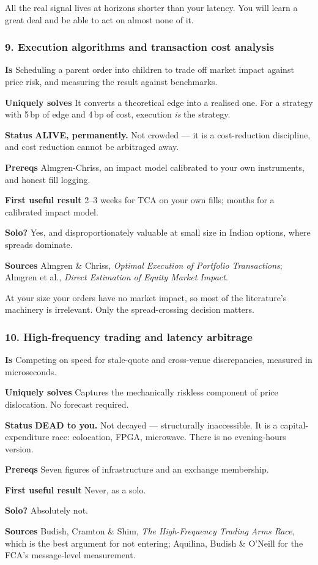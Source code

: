 \documentclass[11pt,a4paper]{article}
\newcommand{\alv}[1]{\textcolor{alive}{\textbf{#1}}}
\newcommand{\dec}[1]{\textcolor{decayed}{\textbf{#1}}}
\newcommand{\fitem}[1]{\par\smallskip\noindent\textbf{#1} }
\begin{document}
\begin{waste}
All the real signal lives at horizons shorter than your latency. You will learn
a great deal and be able to act on almost none of it.
\end{waste}

\subsubsection{9. Execution algorithms and transaction cost analysis}
\fitem{Is}Scheduling a parent order into children to trade off market impact
against price risk, and measuring the result against benchmarks.
\fitem{Uniquely solves}It converts a theoretical edge into a realised one. For a
strategy with 5\,bp of edge and 4\,bp of cost, execution \emph{is} the strategy.
\fitem{Status}\alv{ALIVE, permanently.} Not crowded --- it is a cost-reduction
discipline, and cost reduction cannot be arbitraged away.
\fitem{Prereqs}Almgren-Chriss, an impact model calibrated to your own
instruments, and honest fill logging.
\fitem{First useful result}2--3 weeks for TCA on your own fills; months for a
calibrated impact model.
\fitem{Solo?}Yes, and disproportionately valuable at small size in Indian
options, where spreads dominate.
\fitem{Sources}Almgren \& Chriss, \emph{Optimal Execution of Portfolio
Transactions}; Almgren et al., \emph{Direct Estimation of Equity Market Impact}.

\begin{waste}
At your size your orders have no market impact, so most of the literature's
machinery is irrelevant. Only the spread-crossing decision matters.
\end{waste}

\subsubsection{10. High-frequency trading and latency arbitrage}
\fitem{Is}Competing on speed for stale-quote and cross-venue discrepancies,
measured in microseconds.
\fitem{Uniquely solves}Captures the mechanically riskless component of price
dislocation. No forecast required.
\fitem{Status}\dec{DEAD to you.} Not decayed --- structurally inaccessible. It is
a capital-expenditure race: colocation, FPGA, microwave. There is no
evening-hours version.
\fitem{Prereqs}Seven figures of infrastructure and an exchange membership.
\fitem{First useful result}Never, as a solo.
\fitem{Solo?}Absolutely not.
\fitem{Sources}Budish, Cramton \& Shim, \emph{The High-Frequency Trading Arms
Race}, which is the best argument for not entering; Aquilina, Budish \& O'Neill
for the FCA's message-level measurement.
\end{document}
